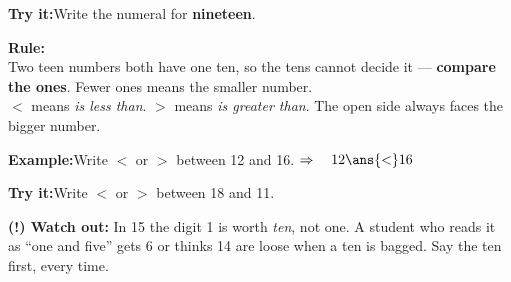 \documentclass[12pt]{article}
\begin{document}
\begin{tryitbox}
\textbf{Try it:}\quad Write the numeral for \textbf{nineteen}.\\[2pt]
\end{tryitbox}


\begin{formulabox}
\textbf{Rule:}\\[4pt]
Two teen numbers both have one ten, so the tens cannot decide it --- \textbf{compare
the ones}. Fewer ones means the smaller number.\\[3pt]
$<$ means \emph{is less than}. \quad $>$ means \emph{is greater than}.
The open side always faces the bigger number.
\end{formulabox}

\begin{examplebox}
\textbf{Example:}\quad Write $<$ or $>$ between 12 and 16.
$\Rightarrow\quad 12 \ans{<} 16$
\end{examplebox}

\begin{tryitbox}
\textbf{Try it:}\quad Write $<$ or $>$ between 18 and 11.\\[2pt]
\end{tryitbox}

\begin{watchoutbox}
\textbf{(!) Watch out:} In 15 the digit 1 is worth \emph{ten}, not one. A student
who reads it as ``one and five'' gets 6 or thinks 14 are loose when a ten is bagged.
Say the ten first, every time.
\end{watchoutbox}
\end{document}

